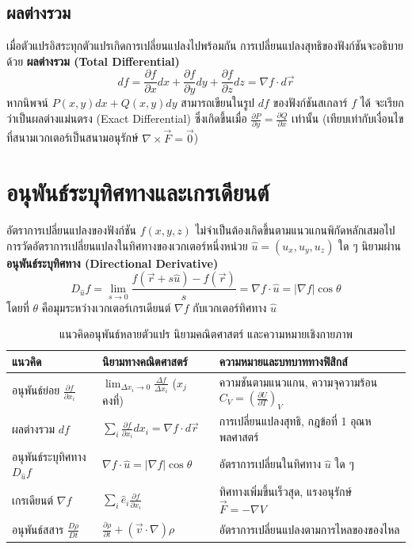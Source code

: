 \subsection{ผลต่างรวม}
เมื่อตัวแปรอิสระทุกตัวแปรเกิดการเปลี่ยนแปลงไปพร้อมกัน การเปลี่ยนแปลงสุทธิของฟังก์ชันจะอธิบายด้วย \textbf{ผลต่างรวม (Total Differential)}
\begin{equation}
df = \frac{\partial f}{\partial x}dx + \frac{\partial f}{\partial y}dy + \frac{\partial f}{\partial z}dz = \nabla f \cdot d\vec{r}
\end{equation}
หากนิพจน์ $P(x,y)dx + Q(x,y)dy$ สามารถเขียนในรูป $df$ ของฟังก์ชันสเกลาร์ $f$ ได้ จะเรียกว่าเป็นผลต่างแม่นตรง (Exact Differential) ซึ่งเกิดขึ้นเมื่อ $\frac{\partial P}{\partial y} = \frac{\partial Q}{\partial x}$ เท่านั้น (เทียบเท่ากับเงื่อนไขที่สนามเวกเตอร์เป็นสนามอนุรักษ์ $\nabla \times \vec{F} = \vec{0}$)

\section{อนุพันธ์ระบุทิศทางและเกรเดียนต์}
อัตราการเปลี่ยนแปลงของฟังก์ชัน $f(x, y, z)$ ไม่จำเป็นต้องเกิดขึ้นตามแนวแกนพิกัดหลักเสมอไป การวัดอัตราการเปลี่ยนแปลงในทิศทางของเวกเตอร์หนึ่งหน่วย $\hat{u} = (u_x, u_y, u_z)$ ใด ๆ นิยามผ่าน \textbf{อนุพันธ์ระบุทิศทาง (Directional Derivative)}
\begin{equation}
D_{\hat{u}}f = \lim_{s \to 0} \frac{f(\vec{r} + s\hat{u}) - f(\vec{r})}{s} = \nabla f \cdot \hat{u} = |\nabla f|\cos\theta
\end{equation}
โดยที่ $\theta$ คือมุมระหว่างเวกเตอร์เกรเดียนต์ $\nabla f$ กับเวกเตอร์ทิศทาง $\hat{u}$

\begin{table}[htbp]
    \centering
    \caption{แนวคิดอนุพันธ์หลายตัวแปร นิยามคณิตศาสตร์ และความหมายเชิงกายภาพ}
    \label{tab:multivar_diff_concepts}
    \begin{tabularx}{\textwidth}{p{3.0cm}p{5.0cm}Y}
        \toprule
        \textbf{แนวคิด} & \textbf{นิยามทางคณิตศาสตร์} & \textbf{ความหมายและบทบาททางฟิสิกส์} \\
        \midrule
        อนุพันธ์ย่อย $\frac{\partial f}{\partial x_i}$ & $\lim_{\Delta x_i \to 0} \frac{\Delta f}{\Delta x_i}$ ($x_j$ คงที่) & ความชันตามแนวแกน, ความจุความร้อน $C_V = (\frac{\partial U}{\partial T})_V$ \\
        ผลต่างรวม $df$ & $\sum_{i} \frac{\partial f}{\partial x_i} dx_i = \nabla f \cdot d\vec{r}$ & การเปลี่ยนแปลงสุทธิ, กฎข้อที่ 1 อุณหพลศาสตร์ \\
        อนุพันธ์ระบุทิศทาง $D_{\hat{u}}f$ & $\nabla f \cdot \hat{u} = |\nabla f|\cos\theta$ & อัตราการเปลี่ยนในทิศทาง $\hat{u}$ ใด ๆ \\
        เกรเดียนต์ $\nabla f$ & $\sum_i \hat{e}_i \frac{\partial f}{\partial x_i}$ & ทิศทางเพิ่มขึ้นเร็วสุด, แรงอนุรักษ์ $\vec{F} = -\nabla V$ \\
        อนุพันธ์สสาร $\frac{D\rho}{Dt}$ & $\frac{\partial \rho}{\partial t} + (\vec{v} \cdot \nabla)\rho$ & อัตราการเปลี่ยนแปลงตามการไหลของของไหล \\
        \bottomrule
    \end{tabularx}
\end{table}

